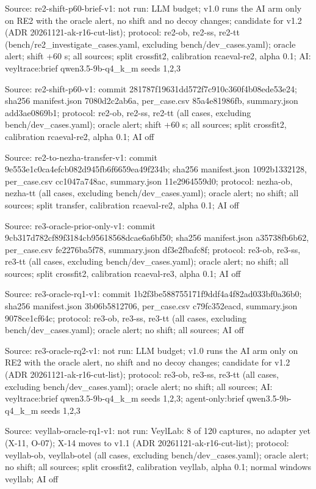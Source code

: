 \noindent Source: re2-shift-p60-brief-v1: not run: LLM budget; v1.0 runs the AI arm only on RE2 with the oracle alert, no shift and no decoy changes; candidate for v1.2 (ADR 20261121-ak-r16-cut-list); protocol: re2-ob, re2-ss, re2-tt (bench/\allowbreak{}re2\_investigate\_cases.yaml, excluding bench/\allowbreak{}dev\_cases.yaml); oracle alert; shift +60 s; all sources; split crossfit2, calibration rcaeval-re2, alpha 0.1; AI: veyltrace:brief qwen3.5-9b-q4\_k\_m seeds 1,2,3\par
\noindent Source: re2-shift-p60-v1: commit 281787f19631dd572f7c910c360f4b08ede53e24; sha256 manifest.json 7080d2c2ab6a, per\_case.csv 85a4e81986fb, summary.json add3ae0869b1; protocol: re2-ob, re2-ss, re2-tt (all cases, excluding bench/\allowbreak{}dev\_cases.yaml); oracle alert; shift +60 s; all sources; split crossfit2, calibration rcaeval-re2, alpha 0.1; AI off\par
\noindent Source: re2-to-nezha-transfer-v1: commit 9e553e1c0ca4efcb082d945fb6f6659ea49f234b; sha256 manifest.json 1092b1332128, per\_case.csv cc1047a748ac, summary.json 11e2964559d0; protocol: nezha-ob, nezha-tt (all cases, excluding bench/\allowbreak{}dev\_cases.yaml); oracle alert; no shift; all sources; split transfer, calibration rcaeval-re2, alpha 0.1; AI off\par
\noindent Source: re3-oracle-prior-only-v1: commit 9cb317d782cf89f3184cb95618568dcae6a6bf50; sha256 manifest.json a35738fb6b62, per\_case.csv fe2276ba5f78, summary.json df3e2fbafc8f; protocol: re3-ob, re3-ss, re3-tt (all cases, excluding bench/\allowbreak{}dev\_cases.yaml); oracle alert; no shift; all sources; split crossfit2, calibration rcaeval-re3, alpha 0.1; AI off\par
\noindent Source: re3-oracle-rq1-v1: commit 1b2f3be588755171f9ddf4a4f82ad033bf0a36b0; sha256 manifest.json 3b06b5812706, per\_case.csv c79fc352eacd, summary.json 9078ce1cf64c; protocol: re3-ob, re3-ss, re3-tt (all cases, excluding bench/\allowbreak{}dev\_cases.yaml); oracle alert; no shift; all sources; AI off\par
\noindent Source: re3-oracle-rq2-v1: not run: LLM budget; v1.0 runs the AI arm only on RE2 with the oracle alert, no shift and no decoy changes; candidate for v1.2 (ADR 20261121-ak-r16-cut-list); protocol: re3-ob, re3-ss, re3-tt (all cases, excluding bench/\allowbreak{}dev\_cases.yaml); oracle alert; no shift; all sources; AI: veyltrace:brief qwen3.5-9b-q4\_k\_m seeds 1,2,3; agent-only:brief qwen3.5-9b-q4\_k\_m seeds 1,2,3\par
\noindent Source: veyllab-oracle-rq1-v1: not run: VeylLab: 8 of 120 captures, no adapter yet (X-11, O-07); X-14 moves to v1.1 (ADR 20261121-ak-r16-cut-list); protocol: veyllab-ob, veyllab-otel (all cases, excluding bench/\allowbreak{}dev\_cases.yaml); oracle alert; no shift; all sources; split crossfit2, calibration veyllab, alpha 0.1; normal windows veyllab; AI off\par
